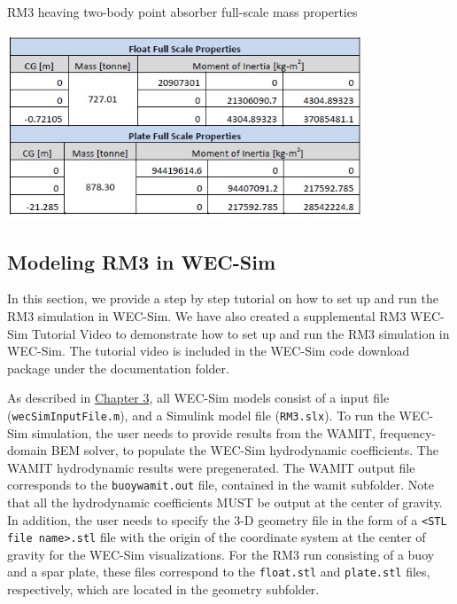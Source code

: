         \begin{table}[H]
        \centering
        \caption{RM3 heaving two-body point absorber full-scale mass properties}
        \includegraphics[width=0.8\textwidth]{application/images/RM3_MassProps}
        \label{RM3_MassProps}
        \end{table}

\subsection{Modeling RM3 in WEC-Sim}
In this section,  we provide a step by step tutorial on how to set up and run the RM3 simulation in WEC-Sim. We have also created a supplemental RM3 WEC-Sim Tutorial Video to demonstrate how to set up and run the RM3 simulation in WEC-Sim. The tutorial video is included in the WEC-Sim code download package under the documentation folder. 

As described in \hyperlink{chapter.3}{Chapter 3}, all WEC-Sim models consist of a input file (\texttt{wecSimInputFile.m}), and a Simulink model file (\texttt{RM3.slx}). To run the WEC-Sim simulation, the user needs to provide results from the WAMIT, frequency-domain BEM solver, to populate the WEC-Sim hydrodynamic coefficients. The WAMIT hydrodynamic results were pregenerated. The WAMIT output file corresponds to the \texttt{buoywamit.out} file, contained in the wamit subfolder. Note that all the hydrodynamic coefficients MUST be output at the center of gravity. In addition, the user needs to specify the 3-D geometry file in the form of a \texttt{<STL file name>.stl} file with the origin of the coordinate system at the center of gravity for the WEC-Sim visualizations. For the RM3 run consisting of a buoy and a spar plate, these files correspond to the \texttt{float.stl} and \texttt{plate.stl} files, respectively, which are located in the geometry subfolder.\\


